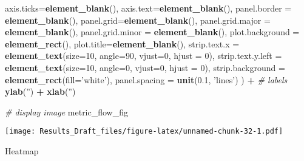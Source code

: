 \documentclass[
]{article}
\newenvironment{Shaded}{\begin{snugshade}}{\end{snugshade}}
\newcommand{\CommentTok}[1]{\textcolor[rgb]{0.56,0.35,0.01}{\textit{#1}}}
\newcommand{\DataTypeTok}[1]{\textcolor[rgb]{0.13,0.29,0.53}{#1}}
\newcommand{\DecValTok}[1]{\textcolor[rgb]{0.00,0.00,0.81}{#1}}
\newcommand{\FloatTok}[1]{\textcolor[rgb]{0.00,0.00,0.81}{#1}}
\newcommand{\KeywordTok}[1]{\textcolor[rgb]{0.13,0.29,0.53}{\textbf{#1}}}
\newcommand{\NormalTok}[1]{#1}
\newcommand{\OperatorTok}[1]{\textcolor[rgb]{0.81,0.36,0.00}{\textbf{#1}}}
\newcommand{\StringTok}[1]{\textcolor[rgb]{0.31,0.60,0.02}{#1}}
\begin{document}
\begin{Shaded}
\begin{Highlighting}[]
                        \DataTypeTok{axis.ticks=}\KeywordTok{element_blank}\NormalTok{(),}
                        \DataTypeTok{axis.text=}\KeywordTok{element_blank}\NormalTok{(),}
                        \DataTypeTok{panel.border =} \KeywordTok{element_blank}\NormalTok{(),}
                        \DataTypeTok{panel.grid=}\KeywordTok{element_blank}\NormalTok{(),}
                        \DataTypeTok{panel.grid.major =} \KeywordTok{element_blank}\NormalTok{(),}
                        \DataTypeTok{panel.grid.minor =} \KeywordTok{element_blank}\NormalTok{(),}
                        \DataTypeTok{plot.background =} \KeywordTok{element_rect}\NormalTok{(),}
                        \DataTypeTok{plot.title=}\KeywordTok{element_blank}\NormalTok{(),}
                        \DataTypeTok{strip.text.x =} \KeywordTok{element_text}\NormalTok{(}\DataTypeTok{size=}\DecValTok{10}\NormalTok{,}
                                          \DataTypeTok{angle=}\DecValTok{90}\NormalTok{, }\DataTypeTok{vjust=}\DecValTok{0}\NormalTok{, }\DataTypeTok{hjust =} \DecValTok{0}\NormalTok{),}
                        \DataTypeTok{strip.text.y.left =} \KeywordTok{element_text}\NormalTok{(}\DataTypeTok{size=}\DecValTok{10}\NormalTok{,}
                                          \DataTypeTok{angle=}\DecValTok{0}\NormalTok{, }\DataTypeTok{vjust=}\DecValTok{0}\NormalTok{, }\DataTypeTok{hjust =} \DecValTok{0}\NormalTok{),}
                        \DataTypeTok{strip.background =} \KeywordTok{element_rect}\NormalTok{(}\DataTypeTok{fill=}\StringTok{'white'}\NormalTok{),}
                        \DataTypeTok{panel.spacing =} \KeywordTok{unit}\NormalTok{(}\FloatTok{0.1}\NormalTok{, }\StringTok{'lines'}\NormalTok{)}
\NormalTok{                        ) }\OperatorTok{+}
\StringTok{                    }\CommentTok{# labels}
\StringTok{                      }\KeywordTok{ylab}\NormalTok{(}\StringTok{''}\NormalTok{) }\OperatorTok{+}\StringTok{ }\KeywordTok{xlab}\NormalTok{(}\StringTok{''}\NormalTok{)}
                


\CommentTok{# display image}
\NormalTok{  metric_flow_fig}
\end{Highlighting}
\end{Shaded}

\texttt{[image: Results\_Draft\_files/figure-latex/unnamed-chunk-32-1.pdf]}

Heatmap
\end{document}
